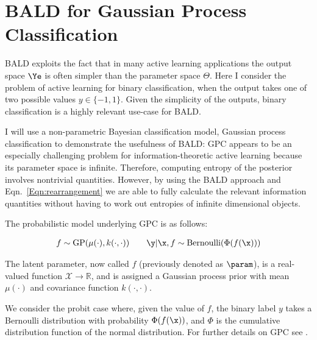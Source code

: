 
\section{BALD for Gaussian Process Classification}

BALD exploits the fact that in many active learning applications the output space $\Ye$ is often simpler than the parameter space $\Theta$. Here I consider the problem of active learning for binary classification, when the output takes one of two possible values $y \in \{-1,1\}$. Given the simplicity of the outputs, binary classification is a highly relevant use-case for BALD.

I will use a non-parametric Bayesian classification model, Gaussian process classification \citep[GPC,][]{rasmussen06GP} to demonstrate the usefulness of BALD: GPC appears to be an especially challenging problem for information-theoretic active learning because its parameter space is infinite. Therefore, computing entropy of the posterior involves nontrivial quantities. However, by using the BALD approach and Eqn.\ \eqref{Eqn:rearrangement} we are able to fully calculate the relevant information quantities without having to work out entropies of infinite dimensional objects. 


The probabilistic model underlying GPC is as follows:

\begin{align}
	f \sim \mathrm{GP}(\mu(\cdot),k(\cdot,\cdot)) \qquad \y\vert\x,f \sim\mathrm{Bernoulli}(\Phi(f(\x))) 
\end{align}

The latent parameter, now called $f$ (previously denoted as $\param$), is a real-valued function $\mathcal{X}\rightarrow\mathbb{R}$, and is assigned a Gaussian process prior with mean $\mu(\cdot)$ and covariance function $k(\cdot,\cdot)$.


We consider the probit case where, given the value of $f$, the binary label $y$ takes a Bernoulli distribution with probability $\Phi(f(\x))$, and $\Phi$ is the cumulative distribution function of the normal distribution. For further details on GPC see \citep{rasmussen2005}.


